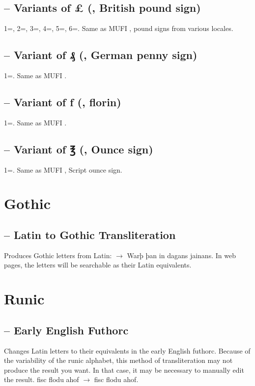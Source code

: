 \subsection{ -- Variants of {\pounds} (, British pound sign)}
1=, 2=, 3=, 4=,
5=, 6=. Same as MUFI , pound signs from various locales.

\subsection{ -- Variant of ₰ (, German penny sign)}
1=. Same as MUFI .

\subsection{ -- Variant of ƒ (, florin)}
1=. Same as MUFI .

\subsection{ -- Variant of ℥ (, Ounce sign)}
1=. Same as MUFI , Script ounce sign.\pagebreak

\section{Gothic}
\subsection{ -- Latin to Gothic Transliteration}
Produces Gothic letters from Latin:  $\rightarrow $
{Warþ þan in dagans
jainans}. In web pages, the letters will be searchable as their Latin equivalents.

\section{Runic}
\subsection{ -- Early English Futhorc}
Changes Latin letters to their equivalents in the early English futhorc. Because of the variability of the runic
alphabet, this method of transliteration may not produce the result you want. In that case, it may be necessary to
manually edit the result. fisc flodu ahof $\rightarrow $ {fisc flodu ahof}.

